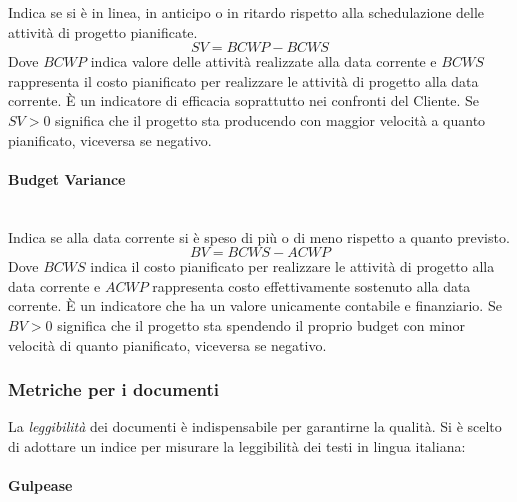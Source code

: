 			Indica se si è in linea, in anticipo o in ritardo rispetto alla schedulazione delle attività di progetto pianificate.
			\[
			SV = BCWP - BCWS
			\]
			Dove $BCWP$ indica valore delle attività realizzate alla data corrente e $BCWS$ rappresenta il costo pianificato per realizzare le attività di progetto alla data corrente. 
			È un indicatore di efficacia soprattutto nei confronti del Cliente. Se $SV>0$ significa che il progetto sta producendo con maggior velocità a quanto pianificato, viceversa se negativo.
			
			\paragraph{Budget Variance}\mbox{} \\
			
			Indica se alla data corrente si è speso di più o di meno rispetto a quanto previsto.
			\[
			BV = BCWS - ACWP
			\]
			Dove $BCWS$ indica il costo pianificato per realizzare le attività di  progetto alla  data corrente e $ACWP$ rappresenta costo effettivamente sostenuto alla data  corrente.
			È un indicatore che ha un valore unicamente contabile e finanziario. Se $BV>0$ significa che il progetto sta spendendo il proprio budget con minor velocità di quanto pianificato, viceversa se negativo. 

			
		\subsubsection{Metriche per i documenti}
		\label{metrichedocumenti}
		
		La \emph{leggibilità} dei documenti è indispensabile per garantirne la qualità. Si è scelto di adottare un indice per misurare la leggibilità dei testi in lingua italiana:
			
			\paragraph{Gulpease}\mbox{} \\
			\label{gulpease}
			
